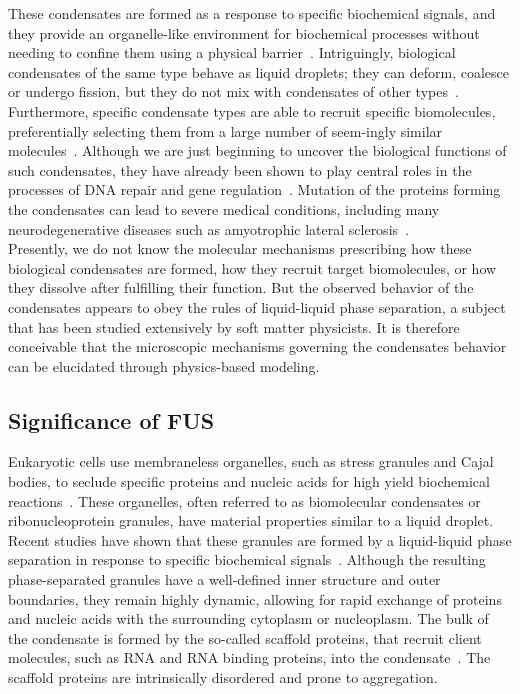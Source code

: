 \documentclass[letterpaper]{article}
\begin{document}
These condensates are formed as a response to specific biochemical signals, and they provide an organelle-like environment for biochemical processes without needing to confine them using a physical barrier~\cite{BANA2017,SHIN2017,BRAN2009,FERI2016,HYMA2014}. Intriguingly, biological condensates of the same type behave as liquid droplets; they can deform, coalesce or undergo fission, but they do not mix with condensates of other types~\cite{SHIN2017}. Furthermore, specific condensate types are able to recruit specific biomolecules, preferentially selecting them from a large number of seem-ingly similar molecules~\cite{BANA2016}. Although we are just beginning to uncover the biological functions of such condensates, they have already been shown to play central roles in the processes of DNA repair and gene regulation~\cite{NAUM2018}. Mutation of the proteins forming the condensates can lead to severe medical conditions, including many neurodegenerative diseases such as amyotrophic lateral sclerosis~\cite{KWIA2009,VANC2009}.\\[0.02cm]

Presently, we do not know the molecular mechanisms prescribing  how these biological condensates are formed, how they recruit target biomolecules, or how they dissolve after fulfilling their function. But the observed behavior of the condensates appears to obey the rules of liquid-liquid phase separation, a subject that has been studied extensively by soft matter physicists. It is therefore conceivable that the microscopic mechanisms governing the condensates behavior can be elucidated through physics-based modeling.

\subsection{Significance of FUS}

Eukaryotic cells use membraneless organelles, such as stress granules and  Cajal bodies, to seclude specific proteins and nucleic acids for high yield biochemical reactions~\cite{BRAN2009,BANA2017}. These organelles, often referred to as biomolecular condensates or ribonucleoprotein granules, have material properties similar to a liquid droplet. 
Recent studies have shown that these granules are formed by a liquid-liquid phase separation in response to specific biochemical signals~\cite{HYMA2014,SHIN2017,FERI2016}. Although the resulting phase-separated granules have a well-defined inner structure and outer boundaries, they  remain highly dynamic, allowing for rapid exchange of proteins and nucleic acids with the surrounding cytoplasm or nucleoplasm. The bulk of the condensate is formed by the so-called scaffold proteins, that recruit client molecules, such as RNA and RNA binding proteins, into the condensate~\cite{BANA2016}. The scaffold proteins are intrinsically disordered and prone to aggregation.\\[0.02cm]
\end{document}
